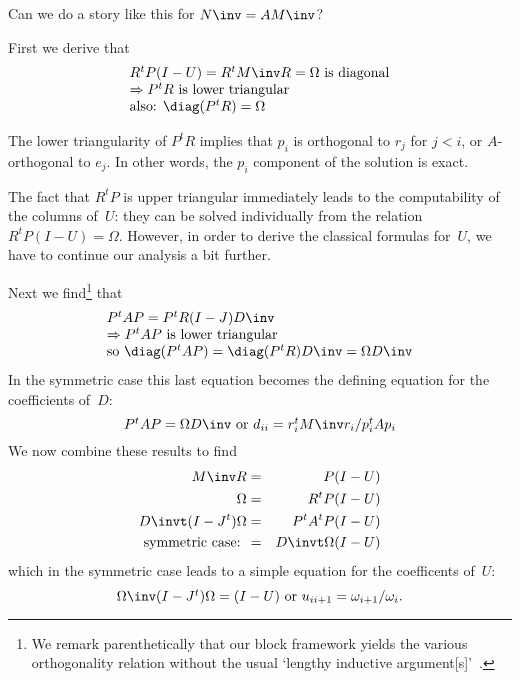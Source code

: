 \documentclass[11pt]{artikel3}
\begin{document}
\begin{Outline}
\begin{question}
Can we do a story like this for $N\inv=AM\inv$?
\end{question}

First we derive that
\begin{equation}
  \label{eq:arnoldi-ptr}
  \begin{array}{l}
    \hbox{$R^tP(I-U)=R^tM\inv R=\Omega$ is diagonal}\\
    \hbox{$\Rightarrow P^tR$ is lower triangular}\\
    \hbox{also: $\diag(P^tR)=\Omega$}
  \end{array}
\end{equation}

\begin{remark}
  The lower triangularity of $P^tR$ implies that $p_i$ is orthogonal
  to $r_j$ for $j<i$, or $A$-orthogonal to $e_j$. In other words, the
  $p_i$ component of the solution is exact.
\end{remark}

\begin{remark}
  The fact that $R^tP$ is upper triangular immediately leads to the
  computability of the columns of~$U$: they can be solved individually
  from the relation $R^tP(I-U)=\Omega$. However, in order to derive the
  classical formulas for~$U$, we have to continue our analysis a bit further.
\end{remark}

Next we find\footnote{We remark parenthetically that our block framework
yields the various orthogonality relation without the usual
`lengthy inductive argument[s]'~\cite{LewisRehm:nonseparable}.} that
\begin{equation}
  \label{eq:arnoldi-ptap}
  \begin{array}{l}
    P^tAP=P^tR(I-J)D\inv\\
    \hbox{$\Rightarrow P^tAP$ is lower triangular}\\
    \hbox{so $\diag(P^tAP)=\diag(P^tR)D\inv = \Omega D\inv$}
  \end{array}
\end{equation}
In the symmetric case this last equation becomes the defining equation
for the coefficients of~$D$:
\begin{equation}
  \label{eq:arnoldi-ptap-sym}
  \hbox{$P^tAP=\Omega D\inv$ or $d_{ii}=r_i^tM\inv r_i/p_i^tAp_i$}
\end{equation}
We now combine these results to find
\begin{eqnarray*}
  M\inv R&=&P(I-U)\\
  \Omega&=&R^tP(I-U)\\
  D\invt(I-J^t)\Omega&=&P^tA^tP(I-U)\\
  \hbox{symmetric case: }&=&D\invt \Omega (I-U)
\end{eqnarray*}
which in the symmetric case leads to a simple equation for the
coefficents of~$U$:
\begin{equation}
  \label{eq:cg-u}
  \hbox{$\Omega\inv (I-J^t)\Omega = (I-U)$ or 
    $u_{ii+1}=\omega_{i+1}/\omega_i$}.
\end{equation}


\end{Outline}
\end{document}
